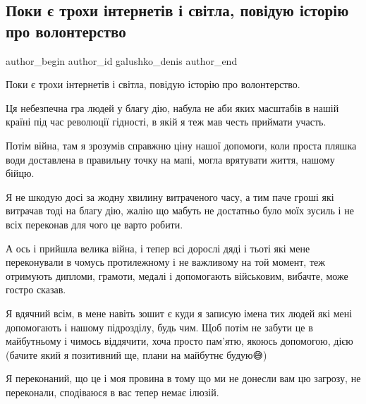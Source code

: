  
 
 
 
 

\subsection{Поки є трохи інтернетів і світла, повідую історію про волонтерство}
\label{sec:05_12_2022.fb.galushko_denis.1.poki___trokhi__ntern}

\ifcmt
 author_begin
   author_id galushko_denis
 author_end
\fi

Поки є трохи інтернетів і світла, повідую історію про волонтерство.

Ця небезпечна гра людей у благу дію, набула не аби яких масштабів в нашій
країні під час революції гідності, в якій я теж мав честь приймати участь. 

Потім війна, там я зрозумів справжню ціну нашої допомоги, коли проста пляшка
води доставлена в правильну точку на мапі, могла врятувати життя, нашому
бійцю. 

Я не шкодую досі за жодну хвилину витраченого часу, а тим паче гроші які
витрачав тоді на благу дію, жалію що мабуть не достатньо було моїх зусиль і
не всіх переконав для чого це варто робити. 

А ось і прийшла велика війна, і тепер всі дорослі дяді і тьоті які мене
переконували в чомусь протилежному і не важливому на той момент, теж
отримують дипломи, грамоти, медалі і допомогають військовим, вибачте, може
гостро сказав.

Я вдячний всім, в мене навіть зошит є куди я записую імена тих людей які мені
допомогають і нашому підрозділу, будь чим. Щоб потім не забути це в майбутньому
і чимось віддячити, хоча просто пам’ятю, якоюсь допомогою, дією (бачите який я
позитивний ще, плани на майбутнє будую😅)

Я переконаний, що це і моя провина в тому що ми не донесли вам цю загрозу, не
переконали, сподіваюся в вас тепер немає ілюзій. 

